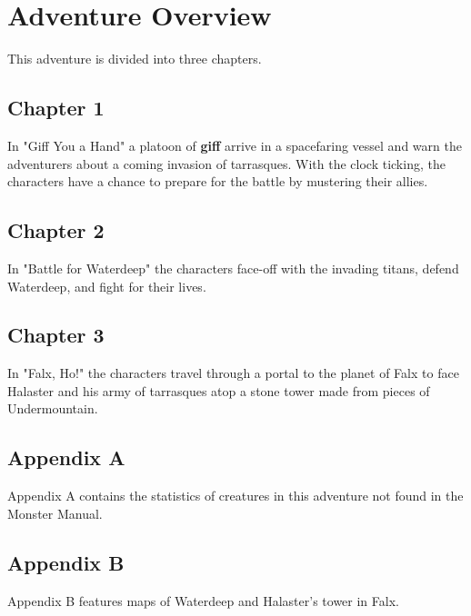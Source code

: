 \documentclass[10pt,a4paper,twoside,bg=print,twocolumn,openany,nodeprecatedcode]{dndbook}
\begin{document}
\section{Adventure Overview}
This adventure is divided into three chapters.

\subsection{Chapter 1}
In "Giff You a Hand" a platoon of \textbf{giff} arrive in a spacefaring vessel and warn the adventurers about a coming invasion of tarrasques. With the clock ticking, the characters have a chance to prepare for the battle by mustering their allies.

\subsection{Chapter 2}
In "Battle for Waterdeep" the characters face-off with the invading titans, defend Waterdeep, and fight for their lives.

\subsection{Chapter 3}
In "Falx, Ho!" the characters travel through a portal to the planet of Falx to face Halaster and his army of tarrasques atop a stone tower made from pieces of Undermountain.

\appendix
\subsection{Appendix A}
Appendix A contains the statistics of creatures in this adventure not found in the Monster Manual.

\subsection{Appendix B}
Appendix B features maps of Waterdeep and Halaster's tower in Falx.
\end{document}
